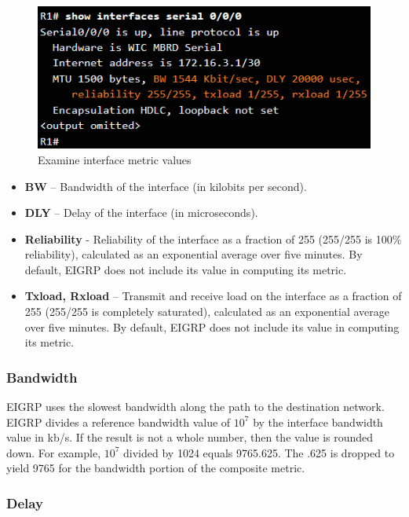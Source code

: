 \begin{figure}[hbtp]
\caption{Examine interface metric values}\label{EIGRPmetric}
\centering
\includegraphics[scale=0.8]{pictures/EIGRPmetric.PNG}
\end{figure}

\begin{itemize}
\item \textbf{BW} -- Bandwidth of the interface (in kilobits per second).
\item \textbf{DLY} -- Delay of the interface (in microseconds).
\item \textbf{Reliability} - Reliability of the interface as a fraction of 255 (255/255 is 100\% reliability), calculated as an exponential average over five minutes. By default, EIGRP does not include its value in computing its metric.
\item \textbf{Txload, Rxload} -- Transmit and receive load on the interface as a fraction of 255 (255/255 is completely saturated), calculated as an exponential average over five minutes. By default, EIGRP does not include its value in computing its metric.
\end{itemize}

\subsubsection{Bandwidth}

EIGRP uses the slowest bandwidth along the path to the destination network. EIGRP divides a reference bandwidth value of $10^7$ by the interface bandwidth value in kb/s. If the result is not a whole number, then the value is rounded down. For example, $10^7$ divided by 1024 equals 9765.625. The .625 is dropped to yield 9765 for the bandwidth portion of the composite metric.

\subsubsection{Delay}


